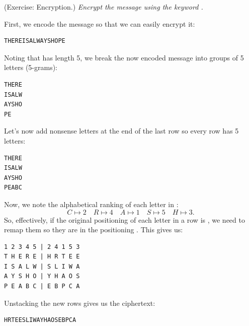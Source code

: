 \documentclass[letterpaper]{article}
\begin{document}
\begin{mdframed}[nobreak=true]
    (Exercise: Encryption.) \emph{Encrypt the message  using the keyword .}

    \begin{mdframed}
        First, we encode the message so that we can easily encrypt it: 
        \begin{mdframed}
            \begin{verbatim}
THEREISALWAYSHOPE\end{verbatim}
        \end{mdframed}

        Noting that  has length 5, we break the now encoded message into groups of 5 letters (5-grams):
        \begin{mdframed}
            \begin{verbatim}
THERE
ISALW
AYSHO
PE\end{verbatim}
        \end{mdframed}
        
        Let's now add nonsense letters at the end of the last row so every row has 5 letters: 
        \begin{mdframed}
            \begin{verbatim}
THERE
ISALW
AYSHO
PEABC\end{verbatim}
        \end{mdframed}

        Now, we note the alphabetical ranking of each letter in :
        \[C \mapsto 2 \quad R \mapsto 4 \quad A \mapsto 1 \quad S \mapsto 5 \quad H \mapsto 3.\]
        So, effectively, if the original positioning of each letter in a row is , we need to remap them so they are in the positioning . This gives us:
        \begin{mdframed}
            \begin{verbatim}
1 2 3 4 5 | 2 4 1 5 3
T H E R E | H R T E E
I S A L W | S L I W A
A Y S H O | Y H A O S
P E A B C | E B P C A\end{verbatim}
        \end{mdframed}
        Unstacking the new rows gives us the ciphertext:
        \begin{mdframed}
            \begin{verbatim}
HRTEESLIWAYHAOSEBPCA\end{verbatim}
        \end{mdframed}
    \end{mdframed}
\end{mdframed}
\end{document}
